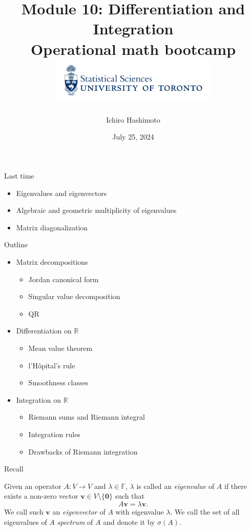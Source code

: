 \documentclass [aspectratio=169]{beamer}
\title[]{Module 10: Differentiation and Integration \\ {\large Operational math bootcamp}\\ \includegraphics[width=8cm]{dept_logo.png}\vspace{-1em}}
\author[]{Ichiro Hashimoto}
\institute[]{University of Toronto}
\date{July 25, 2024}
\newcommand{\bv}{{\mathbf{v}}}
\newcommand{\zerovec}{{\mathbf{0}}}
\newcommand{\R}{{\mathbb{R}}}
\newcommand{\F}{{\mathbb{F}}}
\begin{document}
{
\begin{frame}
    \titlepage
\end{frame}
}

\begin{frame}{Last time}
    \begin{itemize}
      \setlength\itemsep{0.5em}
    	\item Eigenvalues and eigenvectors
	\item Algebraic and geometric multiplicity of eigenvalues
	\item Matrix diagonalization
    \end{itemize}
\end{frame}

\begin{frame}{Outline}
    \begin{itemize}
      \setlength\itemsep{0.5em}
          \item Matrix decompositions
	\begin{itemize}
      \setlength\itemsep{0.25em}
	\item Jordan canonical form
	\item Singular value decomposition
	\item QR
    \end{itemize}
    	\item Differentiation on $\R$
	\begin{itemize}
      \setlength\itemsep{0.25em}
	\item Mean value theorem
	\item l'H\^{o}pital's rule
	\item Smoothness classes
    \end{itemize}
	\item Integration on $\R$
	\begin{itemize}
      \setlength\itemsep{0.25em}
	\item Riemann sums and Riemann integral
	\item Integration rules
	\item Drawbacks of Riemann integration
    \end{itemize}
    \end{itemize}
\end{frame}

\begin{frame}{Recall}

\begin{definition}
Given an operator $A \colon V \to V$ and $\lambda \in \F$, $\lambda$ is called an \emph{eigenvalue} of $A$ if there exists a non-zero vector $\bv \in V\setminus\{\zerovec\}$ such that 
$$A \bv = \lambda \bv.$$
We call such $\bv$ an \emph{eigenvector} of $A$ with eigenvalue $\lambda$. We call the set of all eigenvalues of $A$ \emph{spectrum} of $A$ and denote it by $\sigma(A)$.
\end{definition}
\end{frame}
\end{document}
